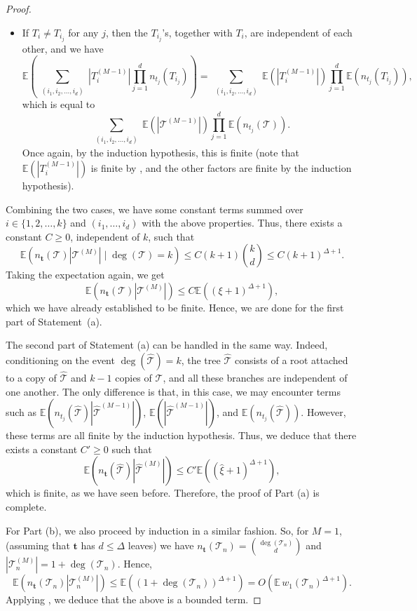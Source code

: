 \documentclass[article]{amsart}
\newcommand{\tc}{\mathcal{T}}
\newcommand{\htc}{\hat{\tc}}
\newcommand{\st}{\textbf{t}}
\newcommand{\n}{n_{\st}}
\newcommand{\hxi}{\hat{\xi}}
\theoremstyle{definition}
\theoremstyle{remark}
\begin{document}
\begin{proof}
\begin{itemize}
    \item If $T_i \neq T_{i_j}$ for any $j$, then the $T_{i_j}$'s, together with $T_i$, are independent of each other, and we have
    \[
    \mathbb{E} \left( \sum_{\substack{(i_1, i_2, \dots, i_d)}} \left| T_i^{(M-1)} \right| \prod_{j=1}^{d} n_{t_j}(T_{i_j}) \right)
    = \sum_{\substack{(i_1, i_2, \dots, i_d)}} \mathbb{E} \left( \left| T_i^{(M-1)} \right| \right) \prod_{j=1}^{d} \mathbb{E} \left( n_{t_j}(T_{i_j}) \right),
    \]
    which is equal to
    \[
    \sum_{\substack{(i_1, i_2, \dots, i_d)}} \mathbb{E} \left( \left| \tc^{(M-1)} \right| \right) \prod_{j=1}^{d} \mathbb{E} \left( n_{t_j}(\tc) \right).
    \]
    Once again, by the induction hypothesis, this is finite (note that $\mathbb{E} ( | T_i^{(M-1)} | )$ is finite by \cite[Lemma~3]{J16}, and the other factors are finite by the induction hypothesis).
\end{itemize}
Combining the two cases, we have some constant terms summed over $i \in \{1, 2, \dots, k\}$ and $(i_1, \dots, i_d)$ with the above properties. Thus, there exists a constant $C \geq 0$, independent of $k$, such that
\[
\mathbb{E} \left( \n(\tc) |\tc^{(M)}| \mid \deg(\tc) = k \right) \leq C (k+1) \binom{k}{d} \leq C (k+1)^{\Delta+1}.
\]
Taking the expectation again, we get
\[
\mathbb{E} \left( \n(\tc) |\tc^{(M)}| \right) \leq C \mathbb{E} \left( (\xi+1)^{\Delta+1} \right),
\]
which we have already established to be finite. Hence, we are done for the first part of Statement~(a).

The second part of Statement (a) can be handled in the same way. Indeed, conditioning on the event $\deg(\htc) = k$, the tree $\htc$ consists of a root attached to a copy of $\htc$ and $k - 1$ copies of $\tc$, and all these branches are independent of one another. The only difference is that, in this case, we may encounter terms such as $\mathbb{E}( n_{t_j}(\htc) |\htc^{(M-1)}| )$, $\mathbb{E}( |\htc^{(M-1)}| )$, and $\mathbb{E}( n_{t_j}(\htc) )$. However, these terms are all finite by the induction hypothesis. Thus, we deduce that there exists a constant $C' \geq 0$ such that
\[
\mathbb{E}(\n(\htc) |\htc^{(M)}|) \leq C' \mathbb{E} \left( (\hxi + 1)^{\Delta + 1} \right),
\]
which is finite, as we have seen before. Therefore, the proof of Part (a) is complete.

For Part (b), we also proceed by induction in a similar fashion. So, for $M = 1$, (assuming that $\st$ has $d\leq \Delta$ leaves) we have  
$\n (\tc_n) = \binom{\deg(\tc_n)}{d}$ and $|\tc_n^{(M)}| = 1 + \deg(\tc_n)$. Hence,
\[
\mathbb{E}(\n(\tc_n) |\tc_n^{(M)}|) \leq \mathbb{E}\left((1 + \deg(\tc_n))^{\Delta + 1}\right) = O(\mathbb{E} \, w_1(\tc_n)^{\Delta + 1}).
\]
Applying \cite[Lemma 2.2]{J06}, we deduce that the above is a bounded term.


\end{proof}
\end{document}
